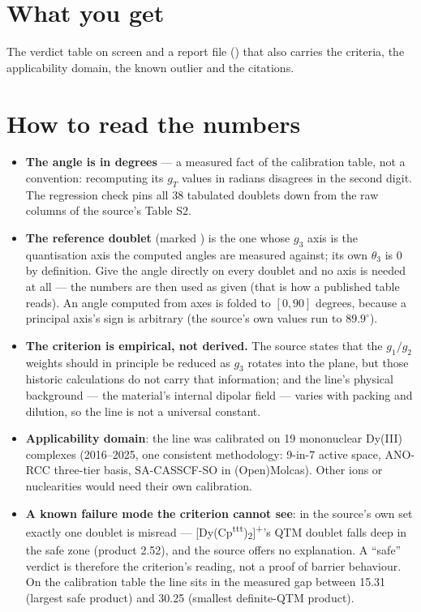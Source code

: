 \section{What you get}

The verdict table on screen and a report file
() that also carries the criteria, the
applicability domain, the known outlier and the citations.

\section{How to read the numbers}

\begin{readbox}
\begin{itemize}
  \item \textbf{The angle is in degrees} --- a measured fact of the calibration
    table, not a convention: recomputing its $g_T$ values in radians disagrees
    in the second digit. The regression check pins all 38 tabulated doublets
    down from the raw columns of the source's Table S2.
  \item \textbf{The reference doublet} (marked \code{*}) is the one whose
    $g_3$ axis is the quantisation axis the computed angles are measured
    against; its own $\theta_3$ is 0 by definition. Give the angle directly on
    every doublet and no axis is needed at all --- the numbers are then used as
    given (that is how a published table reads). An angle computed from axes is
    folded to $[0, 90]$ degrees, because a principal axis's sign is arbitrary
    (the source's own values run to $89.9^\circ$).
  \item \textbf{The criterion is empirical, not derived.}  The source states
    that the $g_1/g_2$ weights should in principle be reduced as $g_3$ rotates
    into the plane, but those historic calculations do not carry that
    information; and the line's physical background --- the material's internal
    dipolar field --- varies with packing and dilution, so the line is not a
    universal constant.
  \item \textbf{Applicability domain}: the line was calibrated on 19
    mononuclear Dy(III) complexes (2016--2025, one consistent methodology:
    9-in-7 active space, ANO-RCC three-tier basis, SA-CASSCF-SO in
    (Open)Molcas). Other ions or nuclearities would need their own calibration.
  \item \textbf{A known failure mode the criterion cannot see}: in the
    source's own set exactly one doublet is misread ---
    [Dy(Cp\textsuperscript{ttt})\textsubscript{2}]\textsuperscript{+}'s QTM
    doublet falls deep in the safe zone (product 2.52), and the source offers
    no explanation. A ``safe'' verdict is therefore the criterion's reading,
    not a proof of barrier behaviour. On the calibration table the line sits in
    the measured gap between 15.31 (largest safe product) and 30.25 (smallest
    definite-QTM product).
\end{itemize}
\end{readbox}

